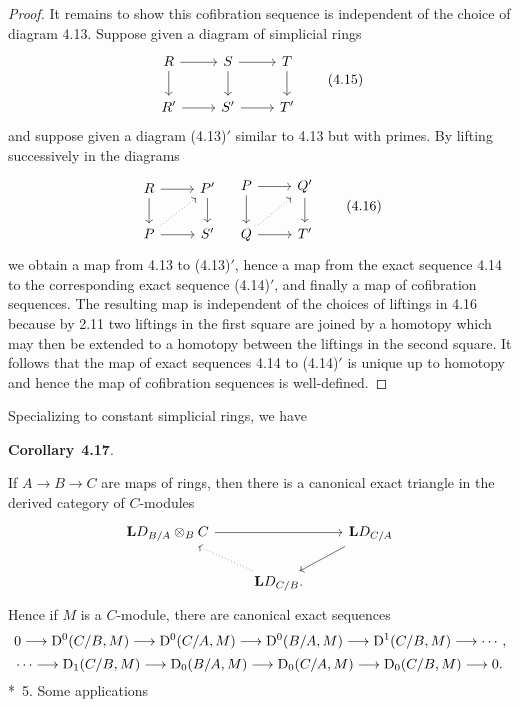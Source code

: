 \documentclass[10pt,reqno]{amsart}
\newenvironment{env}[2]{
\par\medskip\noindent\textbf{#1}~\textbf{#2}.\,\itshape
}
\newcommand{\lra}{\longrightarrow}
\renewcommand{\L}{\mathbf{L}}
\newcommand{\D}{\mathrm{D}}
\begin{document}
\begin{proof}
It remains to show this cofibration sequence is independent of the choice of diagram 4.13. Suppose given a diagram of
simplicial rings
\[
  \begin{tikzcd}
    R\ar[r]\ar[d] & S\ar[r]\ar[d] & T\ar[d]\\
    R'\ar[r] & S'\ar[r] & T'
  \end{tikzcd}
  \tag{4.15}
\]
and suppose given a diagram (4.13)$'$ similar to 4.13 but with primes. By lifting successively in the diagrams
\[
  \begin{tikzcd}
    R\ar[r]\ar[d] & P'\ar[d]\\
    P\ar[ur,dotted]\ar[r] & S'
  \end{tikzcd}
  \quad
  \begin{tikzcd}
    P\ar[r]\ar[d] & Q'\ar[d]\\
    Q\ar[ur,dotted]\ar[r] & T'
  \end{tikzcd}
  \tag{4.16}
\]
we obtain a map from 4.13 to (4.13)$'$, hence a map from the exact sequence 4.14 to the corresponding exact sequence
(4.14)$'$, and finally a map of cofibration sequences. The resulting map is independent of the choices of liftings in
4.16 because by 2.11 two liftings in the first square are joined by a homotopy which may then be extended to a homotopy
between the liftings in the second square. It follows that the map of exact sequences 4.14 to (4.14)$'$ is unique up to
homotopy and hence the map of cofibration sequences is well-defined.
\end{proof}

Specializing to constant simplicial rings, we have
\begin{env}{Corollary}{4.17}
If $A\to B\to C$ are maps of rings, then there is a canonical exact triangle in the derived category of $C$-modules
\[
  \begin{tikzcd}
    \L D_{B/A}\otimes_B C\ar[rr] & & \L D_{C/A}\ar[ld]\\
    & \L D_{C/B}\ar[ul,dotted].
  \end{tikzcd}
\]
Hence if $M$ is a $C$-module, there are canonical exact sequences
\[
  0\lra\D^0(C/B,M)\lra\D^0(C/A,M)\lra\D^0(B/A,M)\lra\D^1(C/B,M)\lra\cdots,
\]
\[
  \cdots\lra\D_1(C/B,M)\lra\D_0(B/A,M)\lra\D_0(C/A,M)\lra\D_0(C/B,M)\lra 0.
\]
\end{env}

\subsection*{\textsection~5. Some applications}
\end{document}
